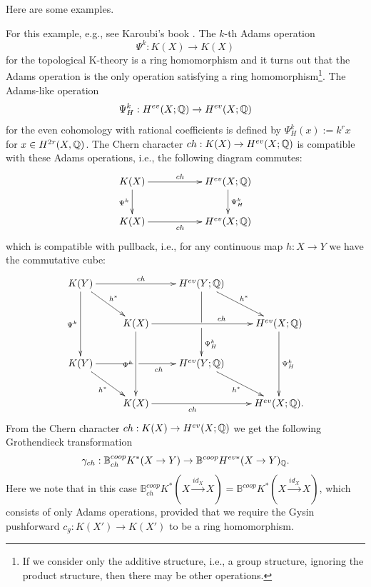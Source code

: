 \documentclass[a4paper]{amsart}
\begin{document}
Here are some examples.
\begin{ex}\label{Adam} For this example, e.g., see Karoubi's book \cite[IV, 7.13 Theorem and V, 3.37 Theorem]{Kar}.
The $k$-th Adams operation 
$$\Psi^k:K(X) \to K(X)$$
 for the topological K-theory is a ring homomorphism and it turns out that the Adams operation is the only operation satisfying a ring homomorphism\footnote{If we consider only the additive structure, i.e., a group structure, ignoring the product structure, then there may be other operations.}. The Adams-like operation 
$$\Psi^k_H:H^{ev}(X;\mathbb Q) \to H^{ev}(X;\mathbb Q)$$
 for the even cohomology with rational coefficients is defined by
 $\Psi^k_H(x) := k^r x$ for $x \in H^{2r}(X, \mathbb Q)$. The Chern character $ch:K(X) \to H^{ev}(X ;\mathbb Q)$ is compatible with these Adams operations, i.e., the following diagram commutes:
$$
\xymatrix
{
K(X) \ar[d]_{\Psi^k}\ar[rr]^{ch}  && H^{ev}(X;\bQ) \ar[d]^{\Psi^k_H}\\
K(X) \ar[rr]_{ch} && H^{ev}(X;\bQ)
}
$$
which is compatible with pullback, i.e., for any continuous map $h:X \to Y$ we have the commutative cube:
\begin{equation*}
\xymatrix
{ K(Y) \ar[dd]_{\Psi^k } \ar[rd]^{h^*} \ar[rr]^{ch} && H^{ev}(Y;\bQ) \ar'[d][dd]^{\Psi^k_H} \ar[rd]^{h^*} \\
& K(X) \ar[dd]_{\Psi^k} \ar[rr]^{ \hspace{1cm} ch}  &&  H^{ev}(X;\bQ)\ar[dd]^{\Psi^k_H} \\
K(Y)\ar'[r] [rr]_{ch \quad \quad }  \ar[rd]_{h^*} && H^{ev}(Y;\bQ)\ar[rd]_{h^*} \\
& K(X) \ar[rr] _{ch \quad \quad  \quad }  &&  H^{ev}(X;\bQ).
}
\end{equation*}
 From the Chern character $ch:K(X) \to H^{ev}(X ;\mathbb Q)$ we get the following Grothendieck transformation
$$\gamma_{ch}: \mathbb B^{coop}_{ch} K^*(X \to Y)  \to  \mathbb B^{coop} H^{ev *}(X \to Y)_{\mathbb Q}.$$
Here we note that in this case $\mathbb B^{coop}_{ch} K^*(X \xrightarrow {id_X} X) = \mathbb B^{coop} K^*(X \xrightarrow {id_X} X)$, which consists of only Adams operations, provided that we require the Gysin pushforward  $c_g:K(X') \to K(X')$ to be a ring homomorphism. 
\end{ex}
\end{document}
